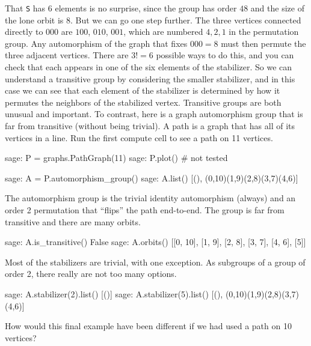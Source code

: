%
That \verb?S? has $6$ elements is no surprise, since the group has order $48$ and the size of the lone orbit is $8$.  But we can go one step further.  The three vertices connected directly to $000$ are $100$, $010$, $001$, which are numbered $4, 2, 1$ in the permutation group.  Any automorphism of the graph that fixes $000 = 8$ must then permute the three adjacent vertices.  There are $3!=6$ possible ways to do this, and you can check that each appears in one of the six elements of the stabilizer.  So we can understand a transitive group by considering the smaller stabilizer, and in this case we can see that each element of the stabilizer is determined by how it permutes the neighbors of the stabilized vertex.
%
Transitive groups are both unusual and important.  To contrast, here is a graph automorphism group that is far from transitive (without being trivial).  A path is a graph that has all of its vertices in a line.  Run the first compute cell to see a path on 11 vertices.
%
%
\begin{sageexample}
sage: P = graphs.PathGraph(11)
sage: P.plot()       # not tested
\end{sageexample}
%
\begin{sageexample}
sage: A = P.automorphism_group()
sage: A.list()
[(), (0,10)(1,9)(2,8)(3,7)(4,6)]
\end{sageexample}
%
The automorphism group is the trivial identity automorphism (always) and an order 2 permutation that ``flips'' the path end-to-end.  The group is far from transitive and there are many orbits.
%
\begin{sageexample}
sage: A.is_transitive()
False
sage: A.orbits()
[[0, 10], [1, 9], [2, 8], [3, 7], [4, 6], [5]]
\end{sageexample}
%
Most of the stabilizers are trivial, with one exception.  As subgroups of a group of order 2, there really are not too many options.
%
\begin{sageexample}
sage: A.stabilizer(2).list()
[()]
sage: A.stabilizer(5).list()
[(), (0,10)(1,9)(2,8)(3,7)(4,6)]
\end{sageexample}
%
How would this final example have been different if we had used a path on 10 vertices?
%